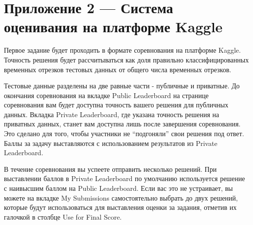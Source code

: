 \section*{Приложение 2 — Система оценивания на платформе Kaggle}

Первое задание будет проходить в формате соревнования на платформе Kaggle. Точность решения будет рассчитываться как доля правильно классифицированных временных отрезков тестовых данных от общего числа временных отрезков.

Тестовые данные разделены на две равные части - публичные и приватные. До окончания соревнования на вкладке Public Leaderboard на странице соревнования вам будет доступна точность вашего решения для публичных данных. Вкладка Private Leaderboard, где указана точность решения на приватных данных, станет вам доступна лишь после завершения соревнования. Это сделано для того, чтобы участники не “подгоняли” свои решения под ответ. Баллы за задачу выставляются с использованием результатов из Private Leaderboard. 

В течение соревнования вы успеете отправить несколько решений. При выставлении баллов в Private Leaderboard по умолчанию используется решение с наивысшим баллом на Public Leaderboard. Если вас это не устраивает, вы можете на вкладке My Submissions самостоятельно выбрать до двух решений, которые будут использоваться для выставления оценки за задания, отметив их галочкой в столбце Use for Final Score.
